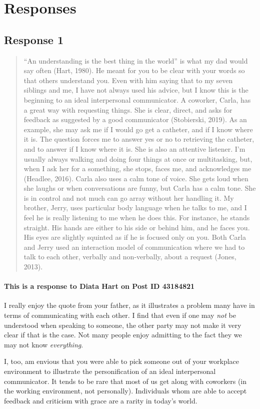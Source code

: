 
\section{Responses}
  \subsection{Response 1}
    \begin{quotation}
      ``An understanding is the best thing in the world'' is what my dad would
        say often (Hart, 1980). He meant for you to be clear with your words so
        that others understand you. Even with him saying that to my seven
        siblings and me, I have not always used his advice, but I know this is
        the beginning to an ideal interpersonal communicator. A coworker, Carla,
        has a great way with requesting things. She is clear, direct, and asks
        for feedback as suggested by a good communicator (Stobierski, 2019). As
        an example, she may ask me if I would go get a catheter, and if I know
        where it is. The question forces me to answer yes or no to retrieving
        the catheter, and to answer if I know where it is. She is also an
        attentive listener. I’m usually always walking and doing four things at
        once or multitasking, but, when I ask her for a something, she stops,
        faces me, and acknowledges me (Headlee, 2016). Carla also uses a calm
        tone of voice. She gets loud when she laughs or when conversations are
        funny, but Carla has a calm tone. She is in control and not much can go
        array without her handling it. My brother, Jerry, uses particular body
        language when he talks to me, and I feel he is really listening to me
        when he does this. For instance, he stands straight. His hands are
        either to his side or behind him, and he faces you. His eyes are
        slightly squinted as if he is focused only on you. Both Carla and Jerry
        used an interaction model of communication where we had to talk to each
        other, verbally and non-verbally, about a request (Jones, 2013).
    \end{quotation}

    \paragraph{This is a response to Diata Hart on Post ID 43184821}
      I really enjoy the quote from your father, as it illustrates a problem
        many have in terms of communicating with each other. I find that even if
        one may \emph{not} be understood when speaking to someone, the other
        party may not make it very clear if that is the case. Not many people
        enjoy admitting to the fact they we may not know \textit{everything}.

      I, too, am envious that you were able to pick someone out of your
        workplace environment to illustrate the personification of an ideal
        interpersonal communicator. It tends to be rare that most of us get
        along with coworkers (in the working environment, not personally).
        Individuals whom are able to accept feedback and criticism with grace
        are a rarity in today's world.
